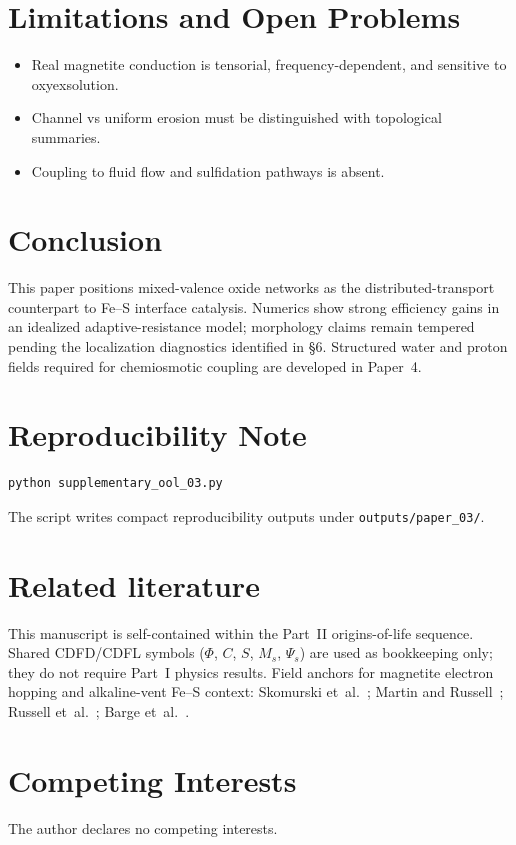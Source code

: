 \documentclass[11pt,a4paper]{article}
\begin{document}
\section{Limitations and Open Problems}
\begin{itemize}
\item Real magnetite conduction is tensorial, frequency-dependent, and sensitive to oxyexsolution.
\item Channel vs uniform erosion must be distinguished with topological summaries.
\item Coupling to fluid flow and sulfidation pathways is absent.
\end{itemize}

\section{Conclusion}
This paper positions mixed-valence oxide networks as the distributed-transport counterpart to Fe--S interface catalysis. Numerics show strong efficiency gains in an idealized adaptive-resistance model; morphology claims remain tempered pending the localization diagnostics identified in \S6. Structured water and proton fields required for chemiosmotic coupling are developed in Paper~4.

\section{Reproducibility Note}
\begin{verbatim}
python supplementary_ool_03.py
\end{verbatim}
The script writes compact reproducibility outputs under \texttt{outputs/paper\_03/}.

\section*{Related literature}
This manuscript is self-contained within the Part~II origins-of-life sequence. Shared CDFD/CDFL symbols ($\Phi$, $C$, $S$, $M_s$, $\Psi_s$) are used as bookkeeping only; they do not require Part~I physics results. Field anchors for magnetite electron hopping and alkaline-vent Fe--S context: Skomurski et~al.~\cite{Skomurski2010}; Martin and Russell~\cite{Martin2007}; Russell et~al.~\cite{Russell1994}; Barge et~al.~\cite{Barge2014}.

\section*{Competing Interests}
The author declares no competing interests.
\end{document}

